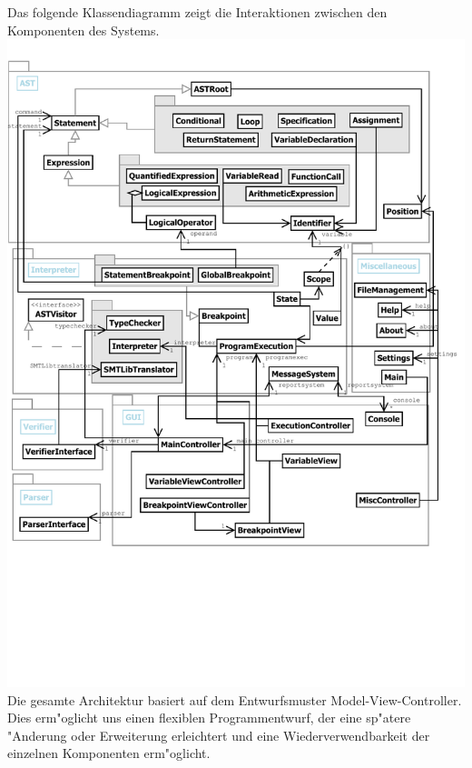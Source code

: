 \documentclass[10pt,a4paper,titlepage]{article}
\begin{document}
Das folgende Klassendiagramm zeigt die Interaktionen zwischen den Komponenten des Systems. \\
\includegraphics[scale=0.85]{images/ClassOverview.pdf} \\
Die gesamte Architektur basiert auf dem Entwurfsmuster Model-View-Controller. Dies erm"oglicht uns einen flexiblen Programmentwurf, der eine sp"atere "Anderung oder Erweiterung erleichtert und eine Wiederverwendbarkeit der einzelnen Komponenten erm"oglicht.
\end{document}
